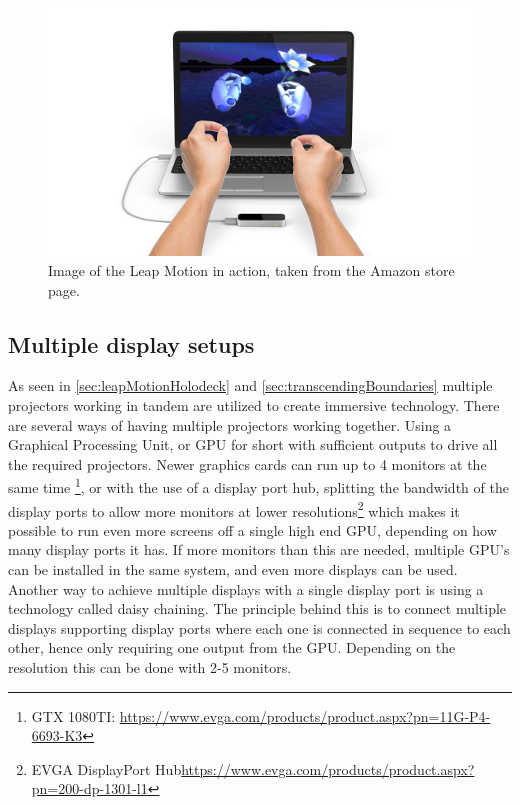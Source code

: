     \begin{figure}[H]
    	\centering
    	\includegraphics[width=0.9\linewidth]{figure/Analysis/leapMotion.jpg}
    	\caption{Image of the Leap Motion in action, taken from the Amazon store page.}
    	\label{fig:leapMotion}
    \end{figure}
    
    \subsection{Multiple display setups}
As seen in \autoref{sec:leapMotionHolodeck} and \autoref{sec:transcendingBoundaries} multiple projectors working in tandem are utilized to create immersive technology. There are several ways of having multiple projectors working together. Using a Graphical Processing Unit, or GPU for short with sufficient outputs to drive all the required projectors. Newer graphics cards can run up to 4 monitors at the same time \footnote{GTX 1080TI: \url{https://www.evga.com/products/product.aspx?pn=11G-P4-6693-K3}}, or with the use of a display port hub, splitting the bandwidth of the display ports to allow more monitors at lower resolutions\footnote{EVGA DisplayPort Hub\url{https://www.evga.com/products/product.aspx?pn=200-dp-1301-l1}} which makes it possible to run even more screens off a single high end GPU, depending on how many display ports it has. If more monitors than this are needed, multiple GPU's can be installed in the same system, and even more displays can be used. Another way to achieve multiple displays with a single display port is using a technology called daisy chaining. The principle behind this is to connect multiple displays supporting display ports where each one is connected in sequence to each other, hence only requiring one output from the GPU. Depending on the resolution this can be done with 2-5 monitors\cite{displayport}.




